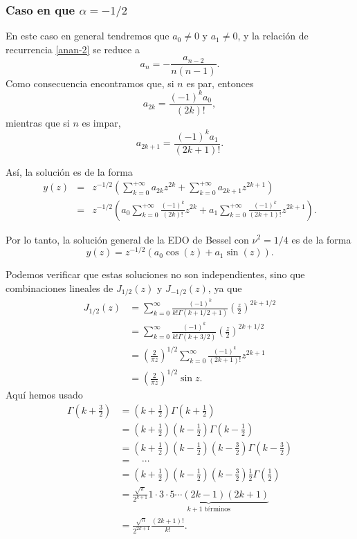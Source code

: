 \begin{scriptsize}
\subsubsection{Caso en que $\alpha=-1/2$}

En este caso en general tendremos que $a_0\neq 0$ y $a_1\neq 0$, y la relación de recurrencia \eqref{anan-2} se reduce a 
\begin{equation}
a_n=-\frac{a_{n-2}}{n(n-1)}.
\end{equation} 
Como consecuencia encontramos que, si $n$ es par, entonces
\begin{equation}
a_{2k}=\frac{(-1)^k a_0}{(2k)!},
\end{equation}
mientras que si $n$ es impar,
\begin{equation}
a_{2k+1}=\frac{(-1)^k a_1}{(2k+1)!}.
\end{equation}

Así, la solución es de la forma
\begin{eqnarray}
y(z)&=&z^{-1/2}\left(\sum_{k=0}^{+\infty}a_{2k}z^{2k}+\sum_{k=0}^{+\infty}a_{2k+1}z^{2k+1} \right)\\
&=&z^{-1/2}\left(a_0\sum_{k=0}^{+\infty}\frac{(-1)^k}{(2k)!}z^{2k}+a_1\sum_{k=0}^{+\infty}\frac{(-1)^k}{(2k+1)!}z^{2k+1} \right).
\end{eqnarray}

Por lo tanto, la solución general de la EDO de Bessel con $\nu^2=1/4$ es de la forma
\begin{equation}
\boxed{y(z)= z^{-1/2}\left(a_0\cos(z)+a_1\sin(z) \right).}
\end{equation}

Podemos verificar que estas soluciones no son independientes, sino que combinaciones lineales de $J_{1/2}(z)$ y $J_{-1/2}(z)$, ya que
\begin{align}
J_{1/2}(z) &= \sum_{k=0}^\infty\frac{(-1)^k}{k!\Gamma(k+1/2+1)}
\left(\frac{z}{2}\right)^{2k+1/2} \\
&= \sum_{k=0}^\infty\frac{(-1)^k}{k!\Gamma(k+3/2)}
\left(\frac{z}{2}\right)^{2k+1/2} \\
&= \left(\frac{2}{\pi z}\right)^{1/2} \sum_{k=0}^\infty \frac{(-1)^k}
{(2k+1)!} z^{2k+1} \\
&= \left(\frac{2}{\pi z}\right)^{1/2} \sin z. \label{J1/2}
\end{align}
Aquí hemos usado
\begin{align}
\Gamma(k+\frac{3}{2}) &= (k+\frac{1}{2})\Gamma(k+\frac{1}{2}) \\
&= (k+\frac{1}{2})(k-\frac{1}{2})\Gamma(k-\frac{1}{2}) \\
&=  (k+\frac{1}{2})(k-\frac{1}{2})(k-\frac{3}{2})\Gamma(k-\frac{3}{2}) \\
&= \quad \cdots \\
&=  (k+\frac{1}{2})(k-\frac{1}{2})(k-\frac{3}{2})\frac{1}{2}\Gamma(\frac{1}{2}) \\
&= \frac{\sqrt{\pi}}{2^{k+1}} \underbrace{1\cdot 3\cdot 5\cdots (2k-1)(2k+1)}_{k+1\text{ términos}} \\
&= \frac{\sqrt{\pi}}{2^{2k+1}}\frac{(2k+1)!}{k!}.
\end{align}


\end{scriptsize}
